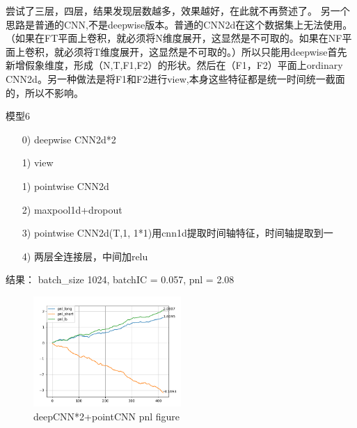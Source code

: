 \documentclass[11pt]{ctexart}
\begin{document}
尝试了三层，四层，结果发现层数越多，效果越好，在此就不再赘述了。
另一个思路是普通的CNN,不是deepwise版本。普通的CNN2d在这个数据集上无法使用。（如果在FT平面上卷积，就必须将N维度展开，这显然是不可取的。如果在NF平面上卷积，就必须将T维度展开，这显然是不可取的。）所以只能用deepwise首先新增假象维度，形成（N,T,F1,F2）的形状。然后在（F1，F2）平面上ordinary CNN2d。另一种做法是将F1和F2进行view,本身这些特征都是统一时间统一截面的，所以不影响。

模型6 
\begin{itemize}
  \item [0)]
  deepwise CNN2d*2
  \item [1)]
  view
  \item [1)]
  pointwise CNN2d
  \item [2)]
  maxpool1d+dropout
  \item [3)]
  pointwise CNN2d(T,1, 1*1)用cnn1d提取时间轴特征，时间轴提取到一
  \item [4)]
  两层全连接层，中间加relu

\end{itemize}
结果： batch\_size 1024, batchIC = 0.057, pnl = 2.08
\begin{figure}[!ht]
\begin{center}
\includegraphics[width=0.5\textwidth]{ws.PNG}
\end{center}
\caption{deepCNN*2+pointCNN pnl figure}
\label{FIG.5}
\end{figure}
\end{document}
